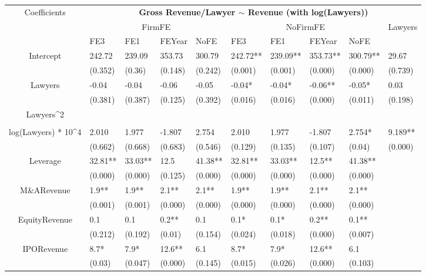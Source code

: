 \documentclass{article}
\begin{document}
\begin{table}[H]
\centering
\begin{tabular}{|clllllllll|}
\hline
\multirow{3}{*}{Coefficients} & \multicolumn{9}{c|}{\textbf{Gross Revenue/Lawyer $\sim$ Revenue (with log(Lawyers))}} \\
\cline{2-10}
& \multicolumn{4}{c}{FirmFE} & \multicolumn{4}{c}{NoFirmFE} & \multirow{2}{*}{Lawyers} \\
\cline{2-9}
& FE3 & FE1 & FEYear & NoFE & FE3 & FE1 & FEYear & NoFE &  \\
\hline
 
Intercept & 242.72 & 239.09 & 353.73 & 300.79 & 242.72** & 239.09** & 353.73** & 300.79** & 29.67 \\ 
   & (0.352) & (0.36) & (0.148) & (0.242) & (0.001) & (0.001) & (0.000) & (0.000) & (0.739) \\ 
  Lawyers & -0.04 & -0.04 & -0.06 & -0.05 & -0.04* & -0.04* & -0.06** & -0.05* & 0.03 \\ 
   & (0.381) & (0.387) & (0.125) & (0.392) & (0.016) & (0.016) & (0.000) & (0.011) & (0.198) \\ 
  Lawyers^2 &  &  &  &  &  &  &  &  &  \\ 
   &  &  &  &  &  &  &  &  &  \\ 
  log(Lawyers) * 10^4 & 2.010 & 1.977 & -1.807 & 2.754 & 2.010 & 1.977 & -1.807 & 2.754* & 9.189** \\ 
   & (0.662) & (0.668) & (0.683) & (0.546) & (0.129) & (0.135) & (0.107) & (0.04) & (0.000) \\ 
  Leverage & 32.81** & 33.03** & 12.5 & 41.38** & 32.81** & 33.03** & 12.5** & 41.38** &  \\ 
   & (0.000) & (0.000) & (0.125) & (0.000) & (0.000) & (0.000) & (0.000) & (0.000) &  \\ 
  M\&ARevenue & 1.9** & 1.9** & 2.1** & 2.1** & 1.9** & 1.9** & 2.1** & 2.1** &  \\ 
   & (0.001) & (0.001) & (0.000) & (0.000) & (0.000) & (0.000) & (0.000) & (0.000) &  \\ 
  EquityRevenue & 0.1 & 0.1 & 0.2** & 0.1 & 0.1* & 0.1* & 0.2** & 0.1** &  \\ 
   & (0.212) & (0.192) & (0.01) & (0.154) & (0.024) & (0.018) & (0.000) & (0.007) &  \\ 
  IPORevenue & 8.7* & 7.9* & 12.6** & 6.1 & 8.7* & 7.9* & 12.6** & 6.1 &  \\ 
   & (0.03) & (0.047) & (0.000) & (0.145) & (0.015) & (0.026) & (0.000) & (0.103) &  \\ 

\end{tabular}
\end{table}
\end{document}
